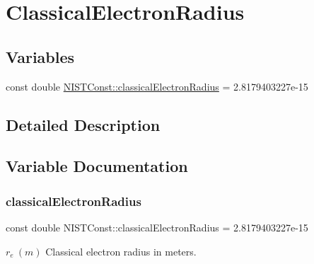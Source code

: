 \hypertarget{group___classical_electron_radius}{}\section{Classical\+Electron\+Radius}
\label{group___classical_electron_radius}
\subsection*{Variables}
\begin{DoxyCompactItemize}
\item 
const double \hyperlink{group___classical_electron_radius_gac67d6a01d8d75cb66290a36f7123942b}{N\+I\+S\+T\+Const\+::classical\+Electron\+Radius} = 2.\+8179403227e-\/15
\end{DoxyCompactItemize}


\subsection{Detailed Description}


\subsection{Variable Documentation}
\mbox{\label{group___classical_electron_radius_gac67d6a01d8d75cb66290a36f7123942b}} 
\subsubsection{\texorpdfstring{classical\+Electron\+Radius}{classicalElectronRadius}}
{\footnotesize\ttfamily const double N\+I\+S\+T\+Const\+::classical\+Electron\+Radius = 2.\+8179403227e-\/15}

$r_e \ (m)$ Classical electron radius in meters. 